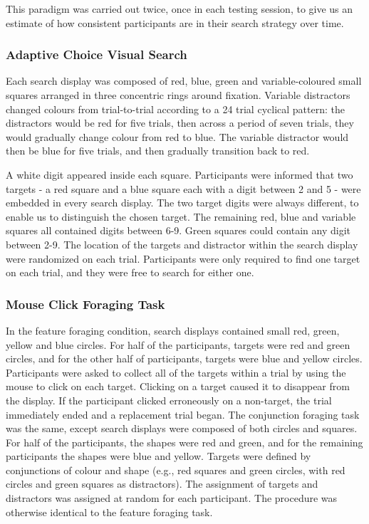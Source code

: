 \documentclass[a4paper, man, natbib, floatsintext]{apa6}
\begin{document}
This paradigm was carried out twice, once in each testing session, to give us an estimate of how consistent participants are in their search strategy over time. 


\subsubsection{Adaptive Choice Visual Search}

Each search display was composed of red, blue, green and variable-coloured small squares arranged in three concentric rings around fixation. Variable distractors changed colours from trial-to-trial according to a 24 trial cyclical pattern: the distractors would be red for five trials, then across a period of seven trials, they would gradually change colour from red to blue. The variable distractor would then be blue for five trials, and then gradually transition back to red. 

A white digit appeared inside each square. Participants were informed that two targets - a red square and a blue square each with a digit between 2 and 5 - were embedded in every search display. The two target digits were always different, to enable us to distinguish the chosen target. The remaining red, blue and variable squares all contained digits between 6-9. Green squares could contain any digit between 2-9. The location of the targets and distractor within the search display were randomized on each trial. Participants were only required to find one target on each trial, and they were free to search for either one.   

\subsubsection{Mouse Click Foraging Task}

In the feature foraging condition, search displays contained small red, green, yellow and blue circles. For half of the participants, targets were red and green circles, and for the other half of participants, targets were blue and yellow circles. Participants were asked to collect all of the targets within a trial by using the mouse to click on each target. Clicking on a target caused it to disappear from the display. If the participant clicked erroneously on a non-target, the trial immediately ended and a replacement trial began. The conjunction foraging task was the same, except search displays were composed of both circles and squares. For half of the participants, the shapes were red and green, and for the remaining participants the shapes were blue and yellow. Targets were defined by conjunctions of colour and shape (e.g., red squares and green circles, with red circles and green squares as distractors). The assignment of targets and distractors was assigned at random for each participant. The procedure was otherwise identical to the feature foraging task. 
\end{document}
